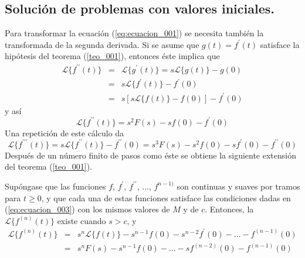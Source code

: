 \subsection*{Solución de problemas con valores iniciales.}
Para transformar la ecuación (\ref{eq:ecuacion_001}) se necesita también la transformada de la segunda derivada. Si se asume que $g(t) = f^{\prime}(t)$ satisface la hipótesis del teorema (\ref{teo_001}), entonces éste implica que
\begin{eqnarray*}
\mathscr{L} \{ f^{\prime \prime} (t) \} &=& \mathscr{L} \{ g^{\prime} (t) \} = s \mathscr{L}\{ g(t) \} - g(0) \nonumber \\
&=& s \mathscr{L}\{ f^{\prime}(t) \} - f^{\prime}(0) \nonumber \\
&=& s [ s \mathscr{L}\{ f(t) \} - f(0) ] - f^{\prime}(0) \nonumber
\end{eqnarray*}
y así
\begin{equation}
\mathscr{L} \{ f^{\prime \prime} (t) \} =  s^{2} F(s) - s f(0) - f^{\prime}(0)
\label{eq:ecuacion_005}
\end{equation}
Una repetición de este cálculo da
\begin{equation}
\mathscr{L} \{ f^{\prime \prime \prime} (t) \} = s \mathscr{L} \{ f^{\prime \prime} (t) \} - f^{\prime \prime}(0) = s^{3} F(s) - s^{2} f(0) - s f^{\prime}(0) - f^{\prime \prime}(0)
\label{eq:ecuacion_005}
\end{equation}
Después de un número finito de pasos como éste se obtiene la siguiente extensión del teorema (\ref{teo_001}).
\begin{cor}
Supóngase que las funciones $f$, $f^{\prime}$, $f^{\prime \prime}$, $\ldots$, $f^{n-1)}$ son continuas y suaves por tramos
para $t \geq 0$, y que cada una de estas funciones satisface las condiciones dadas en (\ref{eq:ecuacion_003}) con los mismos valores de $M$ y de $c$. Entonces, la $\mathscr{L} \{ f^{(n)} (t) \}$ existe cuando $s > c$, y
\begin{eqnarray*}
\mathscr{L} \{ f^{(n)} (t) \} &=& s^{n} \mathscr{L} \{ f(t) \} - s^{n-1} f(0) - s^{n-2} f^{\prime}(0) - \ldots - f^{(n-1)}(0) \\
&=& s^{n} F(s) - s^{n-1} f(0) -  \ldots - s f^{(n-2)}(0) - f^{(n-1)}(0)
\label{eq:ecuacion_007}
\end{eqnarray*}
\end{cor}
